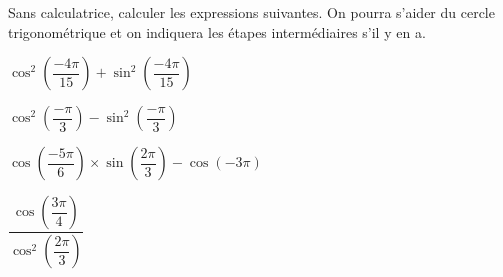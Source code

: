 \documentclass[11pt,a4paper]{article}  %
\begin{document}
\exercice{}

Sans calculatrice, calculer les expressions suivantes. On pourra s'aider du cercle trigonométrique et on indiquera les étapes intermédiaires s'il y en a.
\begin{enumMet}
	\item $\cos ^2\left(\dfrac{-4\pi}{15}\right)+\sin ^2\left(\dfrac{-4\pi}{15}\right)$
	\item $\cos ^2\left(\dfrac{-\pi}{3}\right)-\sin ^2\left(\dfrac{-\pi}{3}\right)$
	\item $\cos \left(\dfrac{-5 \pi}{6}\right) \times \sin \left(\dfrac{2 \pi}{3}\right)-\cos (-3\pi)$
	\item $\dfrac{\cos \left(\dfrac{3\pi}{4}\right)}{\cos ^2\left(\dfrac{2\pi}{3}\right)}$
\end{enumMet}
\end{document}
